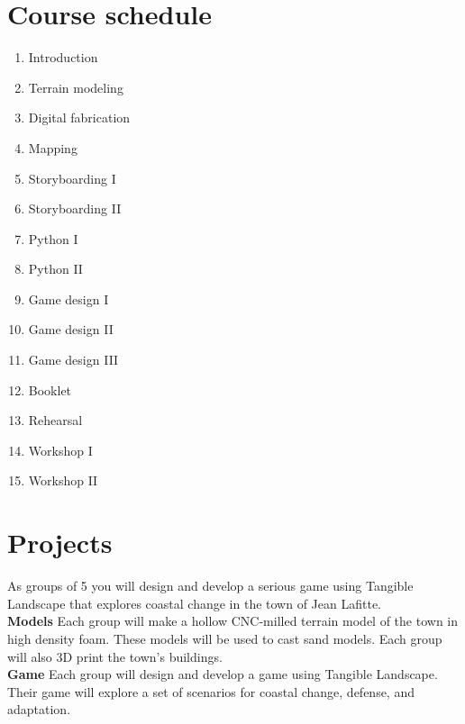 \documentclass[11pt,article,oneside]{memoir}
\begin{document}


\section{Course schedule}
\normalsize

\begin{multicols}{3}
\begin{enumerate}[label=\textbf{\arabic*}]
\small
%
\item Introduction
\item Terrain modeling
\item Digital fabrication
\item Mapping
\item Storyboarding I
\item Storyboarding II
\item Python I
\item Python II
\item Game design I
\item Game design II
\item Game design III
\item Booklet
\item Rehearsal
\item Workshop I
\item Workshop II
%
\end{enumerate}
\end{multicols}

\clearpage

\section{Projects}
As groups of 5 you will
design and develop a serious game using Tangible Landscape
that explores coastal change in the town of Jean Lafitte.
\\

\noindent \textbf{Models}
Each group will make a hollow CNC-milled
terrain model of the town  in high density foam.
These models will be used to cast sand models. 
Each group will also 3D print the town's buildings. 
\\

\noindent \textbf{Game}
Each group will design and develop a game
using Tangible Landscape. 
Their game will explore a set of scenarios
for coastal change, defense, and adaptation. 
\\
\end{document}
